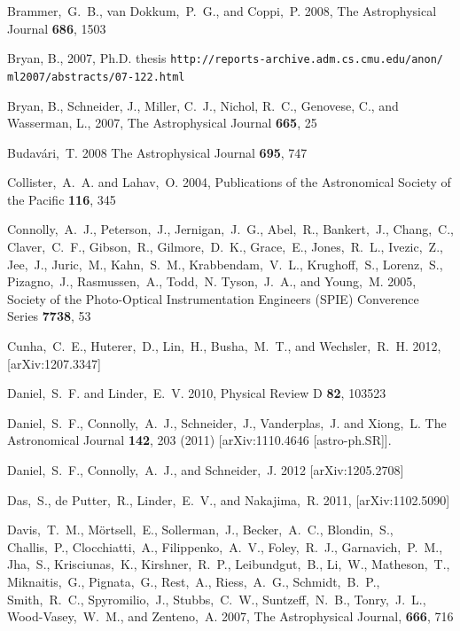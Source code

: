 \documentclass[prd, nofootinbib, floatfix, 12pt,tightenlines]{revtex4}
\begin{document}
\begin{thebibliography}{99}
Brammer,~G.~B., van Dokkum,~P.~G., and Coppi,~P. 2008,
The Astrophysical Journal {\bf 686}, 1503

Bryan, B., 2007, Ph.D. thesis
\verb|http://reports-archive.adm.cs.cmu.edu/anon/|
\verb|ml2007/abstracts/07-122.html|

Bryan, B., Schneider, J., Miller, C.~J., Nichol, R.~C., Genovese, C., and
Wasserman, L., 2007,
The Astrophysical Journal {\bf 665}, 25

Budav\'ari,~T. 2008 The Astrophysical Journal {\bf 695}, 747

Collister,~A.~A. and Lahav,~O. 2004,
Publications of the Astronomical Society of the Pacific {\bf 116}, 345

Connolly,~A.~J., Peterson,~J., Jernigan,~J.~G., Abel,~R., Bankert,~J.,
Chang,~C., Claver,~C.~F., Gibson,~R., Gilmore,~D.~K., Grace,~E., Jones,~R.~L.,
Ivezic,~Z., Jee,~J., Juric,~M., Kahn,~S.~M., Krabbendam,~V.~L., Krughoff,~S.,
Lorenz,~S., Pizagno,~J., Rasmussen,~A., Todd,~N. Tyson,~J.~A., and Young,~M.
2005, Society of the Photo-Optical Instrumentation Engineers (SPIE) Converence
Series {\bf 7738}, 53

Cunha,~C.~E., Huterer,~D., Lin,~H., Busha,~M.~T., and Wechsler,~R.~H. 2012,
[arXiv:1207.3347]

Daniel,~S.~F. and Linder,~E.~V. 2010, Physical Review D {\bf 82}, 103523

  Daniel,~S.~F., Connolly,~A.~J., Schneider,~J., Vanderplas,~J. and Xiong,~L. 
  The Astronomical Journal  {\bf 142}, 203 (2011)
  [arXiv:1110.4646 [astro-ph.SR]].

Daniel,~S.~F., Connolly,~A.~J., and Schneider,~J. 2012
[arXiv:1205.2708]

Das,~S., de Putter,~R., Linder,~E.~V., and Nakajima,~R. 2011,
[arXiv:1102.5090]

Davis,~T.~M., M\"ortsell,~E., Sollerman,~J., Becker,~A.~C., Blondin,~S.,
Challis,~P., Clocchiatti,~A., Filippenko,~A.~V., Foley,~R.~J., Garnavich,~P.~M.,
Jha,~S., Krisciunas,~K., Kirshner,~R.~P., Leibundgut,~B., Li,~W., Matheson,~T.,
Miknaitis,~G., Pignata,~G., Rest,~A., Riess,~A.~G., Schmidt,~B.~P.,
Smith,~R.~C., Spyromilio,~J., Stubbs,~C.~W., Suntzeff,~N.~B., Tonry,~J.~L.,
Wood-Vasey,~W.~M., and Zenteno,~A. 2007, The Astrophysical Journal, {\bf 666},
716


\end{thebibliography}
\end{document}
